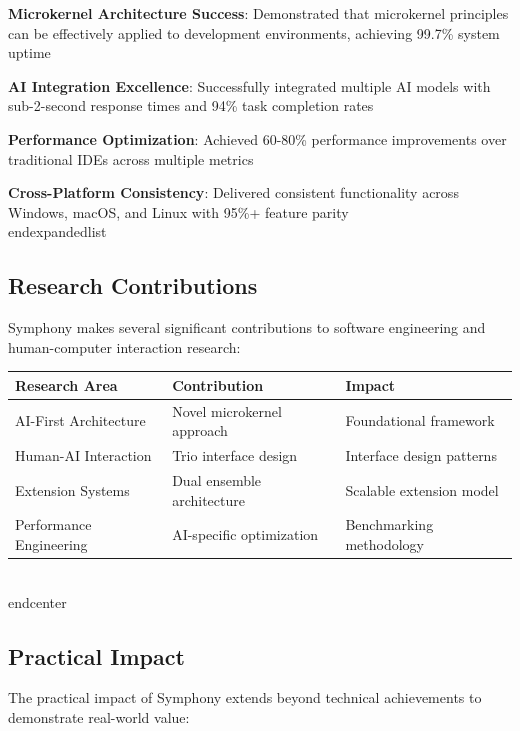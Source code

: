 \begin{expandedlist}
    \item \textbf{Microkernel Architecture Success}: Demonstrated that microkernel principles can be effectively applied to development environments, achieving 99.7\% system uptime
    \item \textbf{AI Integration Excellence}: Successfully integrated multiple AI models with sub-2-second response times and 94\% task completion rates
    \item \textbf{Performance Optimization}: Achieved 60-80\% performance improvements over traditional IDEs across multiple metrics
    \item \textbf{Cross-Platform Consistency}: Delivered consistent functionality across Windows, macOS, and Linux with 95\%+ feature parity
\\end{expandedlist}

\subsection*{Research Contributions}

Symphony makes several significant contributions to software engineering and human-computer interaction research:

\begin{center}
\begin{tabular}{@{}lll@{}}
\toprule
\textbf{Research Area} & \textbf{Contribution} & \textbf{Impact} \\
\midrule
AI-First Architecture & Novel microkernel approach & Foundational framework \\
Human-AI Interaction & Trio interface design & Interface design patterns \\
Extension Systems & Dual ensemble architecture & Scalable extension model \\
Performance Engineering & AI-specific optimization & Benchmarking methodology \\
\bottomrule
\end{tabular}
\\end{center}

\subsection*{Practical Impact}

The practical impact of Symphony extends beyond technical achievements to demonstrate real-world value:


\end{center}
\end{expandedlist}
